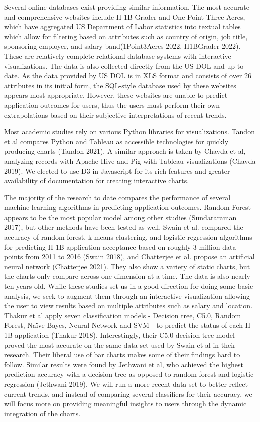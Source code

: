 \documentclass[sigconf]{acmart}
\begin{document}
Several online databases exist providing similar information. The most accurate and comprehensive websites include H-1B Grader and 
One Point Three Acres, which have aggregated US Department of Labor statistics into textual tables which allow for filtering based 
on attributes such as country of origin, job title, sponsoring employer, and salary band(1Point3Acres 2022, H1BGrader 2022). These are relatively complete 
relational database systems with interactive visualizations. The data is also collected directly from the US DOL and up to date. 
As the data provided by US DOL is in XLS format and consists of over 26 attributes in its initial form, the SQL-style database used 
by these websites appears most appropriate. However, these websites are unable to predict application outcomes for users, thus the 
users must perform their own extrapolations based on their subjective interpretations of recent trends.



Most academic studies rely on various Python libraries for visualizations. Tandon et al compares Python and Tableau as accessible technologies 
for quickly producing charts (Tandon 2021). A similar approach is taken by Chavda et al, analyzing records with Apache Hive and Pig with Tableau 
visualizations (Chavda 2019). We elected to use D3 in Javascript for its rich features and greater availability of documentation 
for creating interactive charts. 



The majority of the research to date compares the performance of several machine learning algorithms in predicting application outcomes. 
Random Forest appears to be the most popular model among other studies (Sundararaman 2017), but other methods have been tested as well. 
Swain et al. compared the accuracy of random forest, k-means clustering, and logistic regression algorithms for predicting 
H-1B application acceptance based on roughly 3 million data points from 2011 to 2016 (Swain 2018), and Chatterjee et al. propose an artificial 
neural network (Chatterjee 2021). They also show a variety of static charts, but the charts only compare across one dimension at a time. The data is 
also nearly ten years old. While these studies set us in a good direction for doing some basic analysis, we seek to augment them 
through an interactive visualization allowing the user to view results based on multiple attributes such as salary and location. 
Thakur et al apply seven classification models - Decision tree, C5.0, Random
Forest, Naïve Bayes, Neural Network and SVM - to predict the status of each H-1B application (Thakur 2018). 
Interestingly, their C5.0 decision tree model proved the most accurate on the same data set used by Swain et al in their research. 
Their liberal use of bar charts makes some of their findings hard to follow. Similar results were found by Jethwani et al, who 
achieved the highest prediction accuracy with a decision tree as opposed to random forest and logistic regression (Jethwani 2019). 
We will run a more recent data set to better reflect 
current trends, and instead of comparing several classifiers for their accuracy, we will focus more on providing meaningful insights 
to users through the dynamic integration of the charts.
\end{document}
